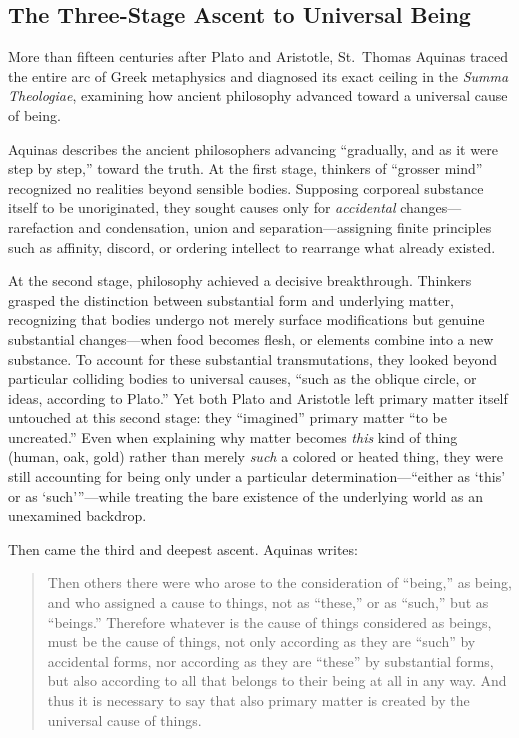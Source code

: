 \subsection{The Three-Stage Ascent to Universal Being}

More than fifteen centuries after Plato and Aristotle, St.\ Thomas Aquinas traced the entire arc of Greek metaphysics and diagnosed its exact ceiling in the \emph{Summa Theologiae}, examining how ancient philosophy advanced toward a universal cause of being.

Aquinas describes the ancient philosophers advancing ``gradually, and as it were step by step,'' toward the truth. At the first stage, thinkers of ``grosser mind'' recognized no realities beyond sensible bodies. Supposing corporeal substance itself to be unoriginated, they sought causes only for \emph{accidental} changes---rarefaction and condensation, union and separation---assigning finite principles such as affinity, discord, or ordering intellect to rearrange what already existed.

At the second stage, philosophy achieved a decisive breakthrough. Thinkers grasped the distinction between substantial form and underlying matter, recognizing that bodies undergo not merely surface modifications but genuine substantial changes---when food becomes flesh, or elements combine into a new substance. To account for these substantial transmutations, they looked beyond particular colliding bodies to universal causes, ``such as the oblique circle, or ideas, according to Plato.'' Yet both Plato and Aristotle left primary matter itself untouched at this second stage: they ``imagined'' primary matter ``to be uncreated.'' Even when explaining why matter becomes \emph{this} kind of thing (human, oak, gold) rather than merely \emph{such} a colored or heated thing, they were still accounting for being only under a particular determination---``either as `this' or as `such'''---while treating the bare existence of the underlying world as an unexamined backdrop.

Then came the third and deepest ascent. Aquinas writes:

\begin{quote}
Then others there were who arose to the consideration of ``being,'' as being, and who assigned a cause to things, not as ``these,'' or as ``such,'' but as ``beings.'' Therefore whatever is the cause of things considered as beings, must be the cause of things, not only according as they are ``such'' by accidental forms, nor according as they are ``these'' by substantial forms, but also according to all that belongs to their being at all in any way. And thus it is necessary to say that also primary matter is created by the universal cause of things.
\end{quote}

